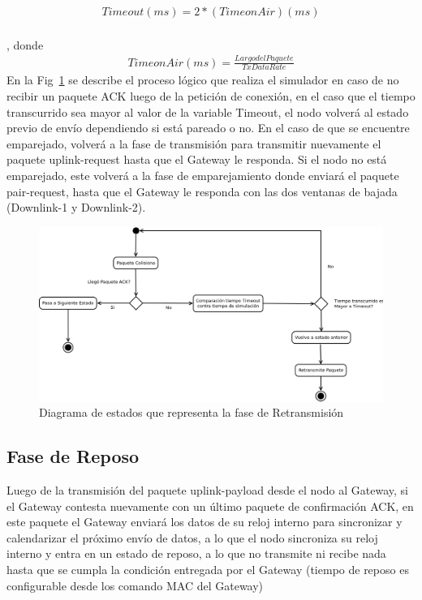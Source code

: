 \begin{justify}
\begin{eqnarray}
 Timeout(ms) = 2*(Time on Air)(ms)\end{eqnarray} \\
, donde \begin{eqnarray}
 Time on Air(ms)= \frac{Largo del Paquete}{Tx Data Rate}\end{eqnarray}
\noindent
En la Fig~\ref{retrans:1} se describe el proceso lógico que realiza el simulador en caso de no recibir un paquete ACK luego de la petición de conexión, en el caso que el tiempo transcurrido sea mayor al valor de la variable Timeout, el nodo volverá al estado previo de envío dependiendo si está pareado o no. En el caso de que se encuentre emparejado, volverá a la fase de transmisión para transmitir nuevamente el paquete uplink-request hasta que el Gateway le responda. Si el nodo no está emparejado, este volverá a la fase de emparejamiento donde enviará el paquete pair-request, hasta que el Gateway le responda con las dos ventanas de bajada (Downlink-1 y Downlink-2).
\begin{figure}[!ht]
\centering
\includegraphics[scale=0.35]{diagramas/retrans}
\caption{Diagrama de estados que representa la fase de Retransmisión}
\label{retrans:1}
\end{figure}
\subsection{Fase de Reposo}
Luego de la transmisión del paquete uplink-payload desde el nodo al Gateway, si el Gateway contesta nuevamente con un último paquete de confirmación ACK, en este paquete el Gateway enviará los datos de su reloj interno para sincronizar y calendarizar el próximo envío de datos, a lo que el nodo sincroniza su reloj interno y entra en un estado de reposo, a lo que no transmite ni recibe nada hasta que se cumpla la condición entregada por el Gateway (tiempo de reposo es configurable desde los comando MAC del Gateway)

\end{justify}
